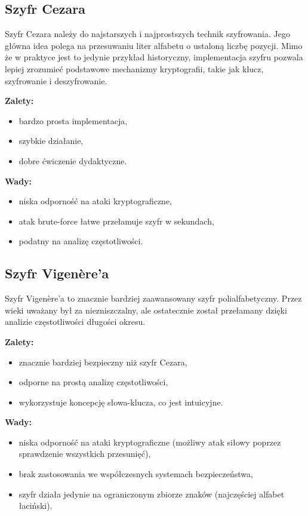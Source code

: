 \documentclass[12pt,a4paper]{article}
\begin{document}
\subsection{Szyfr Cezara}
Szyfr Cezara należy do najstarszych i najprostszych technik szyfrowania. 
Jego główna idea polega na przesuwaniu liter alfabetu o ustaloną liczbę pozycji. 
Mimo że w praktyce jest to jedynie przykład historyczny, implementacja szyfru pozwala lepiej zrozumieć podstawowe mechanizmy kryptografii, takie jak klucz, szyfrowanie i deszyfrowanie.

\textbf{Zalety:}
\begin{itemize}
    \item bardzo prosta implementacja,
    \item szybkie działanie,
    \item dobre ćwiczenie dydaktyczne.
\end{itemize}

\textbf{Wady:}
\begin{itemize}
    \item niska odporność na ataki kryptograficzne,
    \item atak brute-force łatwe przełamuje szyfr w sekundach,
    \item podatny na analizę częstotliwości.
\end{itemize}

\subsection{Szyfr Vigenère'a}
Szyfr Vigenère'a to znacznie bardziej zaawansowany szyfr polialfabetyczny. 
Przez wieki uważany był za niezniszczalny, 
ale ostatecznie został przełamany dzięki analizie częstotliwości długości okresu.

\textbf{Zalety:}
\begin{itemize}
    \item znacznie bardziej bezpieczny niż szyfr Cezara,
    \item odporne na prostą analizę częstotliwości,
    \item wykorzystuje koncepcję słowa-klucza, co jest intuicyjne.
\end{itemize}

\textbf{Wady:}
\begin{itemize}
    \item niska odporność na ataki kryptograficzne (możliwy atak siłowy poprzez sprawdzenie wszystkich przesunięć),
    \item brak zastosowania we współczesnych systemach bezpieczeństwa,
    \item szyfr działa jedynie na ograniczonym zbiorze znaków (najczęściej alfabet łaciński).
\end{itemize}
\end{document}
